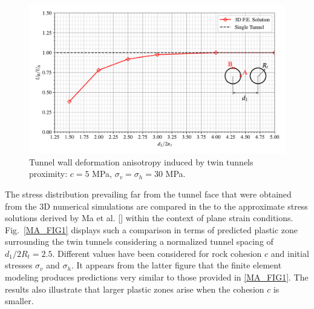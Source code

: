 \documentclass[a4paper,fleqn]{cas-sc}
\begin{document}
\begin{figure}[h!]
	\centering
	\includegraphics[scale=0.65]{MA_Relationship between Convergence in B and A.pdf}
	\caption{Tunnel wall deformation anisotropy induced by twin tunnels proximity: $c=5$ MPa, $\sigma_v = \sigma_h = 30$ MPa.}
	\label{MA_Relationship between convergence in B and A}
\end{figure}
\FloatBarrier

The stress distribution prevailing far from the tunnel face that were obtained from the 3D numerical simulations are compared in the to the approximate stress solutions derived by Ma et al. [] within the context of plane strain conditions. Fig.~\ref{MA_FIG1} displays such a comparison in terms of predicted plastic zone surrounding the twin tunnels considering a normalized tunnel spacing of $d_1/2R_t = 2.5$.  Different values have been considered for rock cohesion $c$ and initial stresses $\sigma_v$ and $\sigma_h$. It appears from the latter figure that the finite element modeling produces predictions very similar to those provided in \ref{MA_FIG1}. The results also illustrate that larger plastic zones arise when the cohesion $c$ is smaller.
\end{document}
